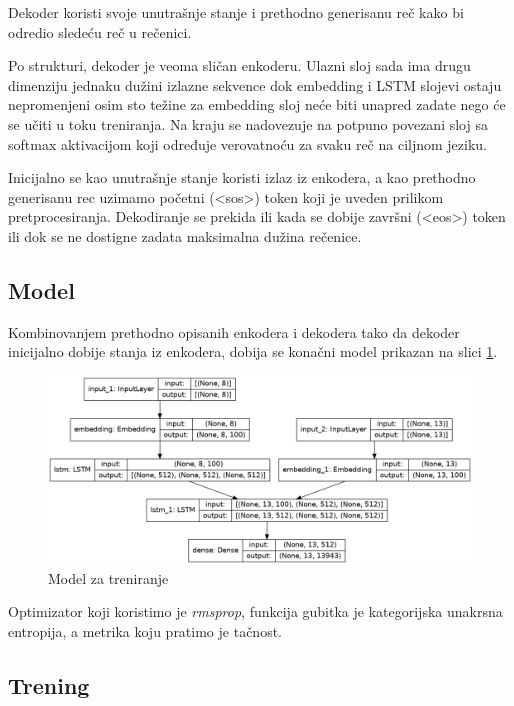 \documentclass[a4paper]{article}
\begin{document}
Dekoder koristi svoje unutrašnje stanje i prethodno generisanu reč kako bi odredio sledeću reč u rečenici.

Po strukturi, dekoder je veoma sličan enkoderu.
Ulazni sloj sada ima drugu dimenziju jednaku dužini izlazne sekvence dok embedding i LSTM slojevi ostaju nepromenjeni osim sto težine za embedding sloj neće biti unapred zadate nego će se učiti u toku treniranja.
Na kraju se nadovezuje na potpuno povezani sloj sa softmax aktivacijom koji određuje verovatnoću za svaku reč na ciljnom jeziku.

Inicijalno se kao unutrašnje stanje koristi izlaz iz enkodera, a kao prethodno generisanu rec uzimamo početni (\textless sos\textgreater) token koji je uveden prilikom pretprocesiranja. Dekodiranje se prekida ili kada se dobije završni (\textless eos\textgreater) token ili dok se ne dostigne zadata maksimalna dužina rečenice.

\subsection{Model}

Kombinovanjem prethodno opisanih enkodera i dekodera tako da dekoder inicijalno dobije stanja iz enkodera, dobija se konačni model prikazan na slici \ref{fig:model}.

\begin{figure}[h!]
  \centering
    \includegraphics[width=\textwidth]{model}
  \caption{Model za treniranje}
  \label{fig:model}
\end{figure}

Optimizator koji koristimo je \textit{rmsprop}, funkcija gubitka je kategorijska unakrsna entropija, a metrika koju pratimo je tačnost.

\subsection{Trening}
\end{document}
